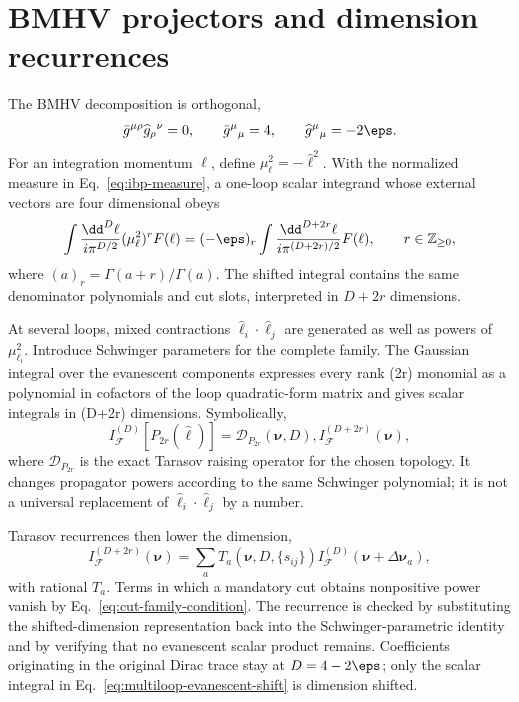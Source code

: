 \section{BMHV projectors and dimension recurrences}
\label{app:bmhv-dimension-shift}

The BMHV decomposition is orthogonal,
\begin{equation}
 \bar g^{\mu\rho}\widehat g_{\rho}{}^{\nu}=0,
 \qquad
 \bar g^\mu{}_{\mu}=4,
 \qquad
 \widehat g^\mu{}_{\mu}=-2\eps.
 \label{eq:bmhv-orthogonal-metrics}
\end{equation}
For an integration momentum $\ell$, define
\(\mu_\ell^2=-\widehat\ell^2\).  With the normalized measure in
Eq.~\eqref{eq:ibp-measure}, a one-loop scalar integrand whose external vectors
are four dimensional obeys
\begin{equation}
 \int\frac{\dd^D\ell}{i\pi^{D/2}}
 (\mu_\ell^2)^r F(\ell)
 =(-\eps)_r
 \int\frac{\dd^{D+2r}\ell}{i\pi^{(D+2r)/2}}F(\ell),
 \qquad r\in\mathbb Z_{\geq0},
 \label{eq:one-loop-dimension-shift}
\end{equation}
where $(a)_r=\Gamma(a+r)/\Gamma(a)$.  The shifted integral contains the same
denominator polynomials and cut slots, interpreted in $D+2r$ dimensions.

At several loops, mixed contractions
${\widehat\ell_i\cdot\widehat\ell_j}$ are generated as well as powers of
$\mu_{\ell_i}^2$.  Introduce Schwinger parameters for the complete family.
The Gaussian integral over the evanescent components expresses every rank
(2r) monomial as a polynomial in cofactors of the loop quadratic-form matrix
and gives scalar integrals in (D+2r) dimensions.  Symbolically,
\begin{equation}
 I^{(D)}_{\mathcal F}[P_{2r}(\widehat\ell)]
 =\mathcal D_{P_{2r}}(\boldsymbol\nu,D),
 I_{\mathcal F}^{(D+2r)}(\boldsymbol\nu),
 \label{eq:multiloop-evanescent-shift}
\end{equation}
where $\mathcal D_{P_{2r}}$ is the exact Tarasov raising operator for the
chosen topology.  It changes propagator powers according to the same Schwinger
polynomial; it is not a universal replacement of
$\widehat\ell_i\cdot\widehat\ell_j$ by a number.

Tarasov recurrences then lower the dimension,
\begin{equation}
 I_{\mathcal F}^{(D+2r)}(\boldsymbol\nu)
 =\sum_{a}T_a(\boldsymbol\nu,D,\{s_{ij}\})
 I_{\mathcal F}^{(D)}(\boldsymbol\nu+\Delta\boldsymbol\nu_a),
 \label{eq:tarasov-lowering}
\end{equation}
with rational $T_a$.  Terms in which a mandatory cut obtains nonpositive
power vanish by Eq.~\eqref{eq:cut-family-condition}.  The recurrence is
checked by substituting the shifted-dimension representation back into the
Schwinger-parametric identity and by verifying that no evanescent scalar
product remains.  Coefficients originating in the original Dirac trace stay
at $D=4-2\eps$; only the scalar integral in
Eq.~\eqref{eq:multiloop-evanescent-shift} is dimension shifted.
